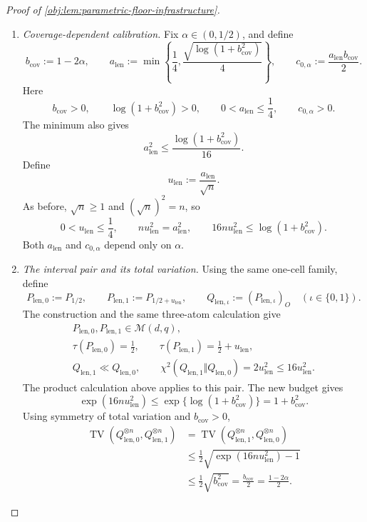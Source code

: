 \begin{proof}[Proof of \cref{obj:lem:parametric-floor-infrastructure}]
\begin{enumerate}
\item \emph{Coverage-dependent calibration.}
Fix \(\alpha\in(0,1/2)\), and define
\[
b_{\mathrm{cov}}:=1-2\alpha,
\qquad
a_{\mathrm{len}}
:=
\min\left\{
\frac14,\frac{\sqrt{\log(1+b_{\mathrm{cov}}^2)}}4
\right\},
\qquad
c_{0,\alpha}:=\frac{a_{\mathrm{len}}b_{\mathrm{cov}}}{2}.
\]
Here
\[
b_{\mathrm{cov}}>0,
\qquad
\log(1+b_{\mathrm{cov}}^2)>0,
\qquad
0<a_{\mathrm{len}}\le\frac14,
\qquad
c_{0,\alpha}>0.
\]
The minimum also gives
\[
a_{\mathrm{len}}^2
\le\frac{\log(1+b_{\mathrm{cov}}^2)}{16}.
\]
Define
\[
u_{\mathrm{len}}:=\frac{a_{\mathrm{len}}}{\sqrt n}.
\]
As before, \(\sqrt n\ge1\) and \((\sqrt n)^2=n\), so
\[
0<u_{\mathrm{len}}\le\frac14,
\qquad
n u_{\mathrm{len}}^2=a_{\mathrm{len}}^2,
\qquad
16n u_{\mathrm{len}}^2\le\log(1+b_{\mathrm{cov}}^2).
\]
Both \(a_{\mathrm{len}}\) and \(c_{0,\alpha}\) depend only on \(\alpha\).

\item \emph{The interval pair and its total variation.}
Using the same one-cell family, define
\[
P_{\mathrm{len},0}:=P_{1/2},
\qquad
P_{\mathrm{len},1}:=P_{1/2+u_{\mathrm{len}}},
\qquad
Q_{\mathrm{len},\iota}:=(P_{\mathrm{len},\iota})_O
\quad(\iota\in\{0,1\}).
\]
The construction and the same three-atom calculation give
\[
\begin{gathered}
P_{\mathrm{len},0},P_{\mathrm{len},1}\in\mathcal M(d,q),\\
\tau(P_{\mathrm{len},0})=\frac12,
\qquad
\tau(P_{\mathrm{len},1})=\frac12+u_{\mathrm{len}},\\
Q_{\mathrm{len},1}\ll Q_{\mathrm{len},0},
\qquad
\chi^2(Q_{\mathrm{len},1}\Vert Q_{\mathrm{len},0})
=2u_{\mathrm{len}}^2\le16u_{\mathrm{len}}^2.
\end{gathered}
\]
The product calculation above applies to this pair. The new budget gives
\[
\exp(16n u_{\mathrm{len}}^2)
\le
\exp\{\log(1+b_{\mathrm{cov}}^2)\}
=
1+b_{\mathrm{cov}}^2.
\]
Using symmetry of total variation and \(b_{\mathrm{cov}}>0\),
\[
\begin{aligned}
\operatorname{TV}
 (Q_{\mathrm{len},0}^{\otimes n},Q_{\mathrm{len},1}^{\otimes n})
&=
\operatorname{TV}
 (Q_{\mathrm{len},1}^{\otimes n},Q_{\mathrm{len},0}^{\otimes n})\\
&\le\frac12\sqrt{\exp(16n u_{\mathrm{len}}^2)-1}\\
&\le\frac12\sqrt{b_{\mathrm{cov}}^2}
=\frac{b_{\mathrm{cov}}}{2}
=\frac{1-2\alpha}{2}.
\end{aligned}
\]


\end{enumerate}
\end{proof}
